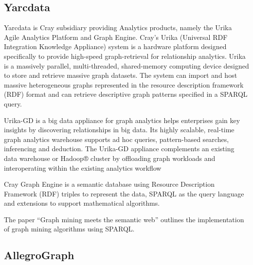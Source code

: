 \subsection{ Yarcdata}

     Yarcdata is Cray subsidiary providing Analytics
     products, namely the Urika Agile Analytics Platform and Graph
     Engine. Cray’s Urika (Universal RDF Integration Knowledge
     Appliance) system \cite{www-Urika-appliance} is a hardware
     platform designed specifically to provide high-speed
     graph-retrieval for relationship analytics. Urika is a massively
     parallel, multi-threaded, shared-memory computing device designed
     to store and retrieve massive graph datasets. The system can
     import and host massive heterogeneous graphs represented in the
     resource description framework (RDF) format and can retrieve
     descriptive graph patterns specified in a SPARQL query.

     Urika-GD \cite{techspec-Urika-GD} is a big data appliance for
     graph analytics helps enterprises gain key insights by
     discovering relationships in big data. Its highly scalable,
     real-time graph analytics warehouse supports ad hoc queries,
     pattern-based searches, inferencing and deduction. The Urika-GD
     appliance complements an existing data warehouse or Hadoop®
     cluster by offloading graph workloads and interoperating within
     the existing analytics workflow

     Cray Graph Engine \cite{paper-graph-data} is a semantic database
     using Resource Description Framework (RDF) triples to represent
     the data, SPARQL as the query language and extensions to support
     mathematical algorithms.

     The paper ``Graph mining meets the semantic web''
     \cite{paper-lee2015graph} outlines the implementation of graph
     mining algorithms using SPARQL.

\subsection{ AllegroGraph}
     
